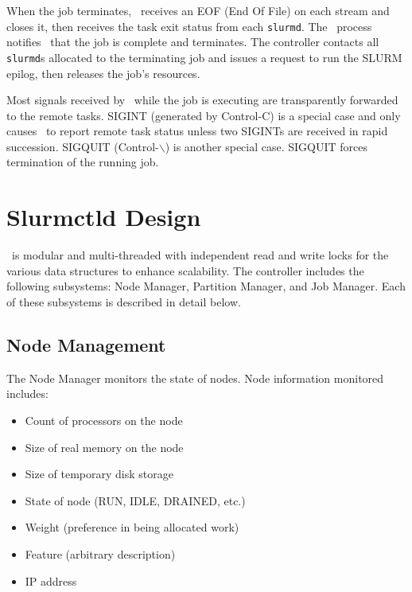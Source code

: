 \documentclass[10pt,onecolumn,times]{llncs}
\begin{document}
{When the job terminates, \srun\ receives an EOF (End Of File) on each
stream and closes it, then receives the task exit status from each
{\tt slurmd}.  The \srun\ process notifies \slurmctld\ that the job is
complete and terminates. The controller contacts all {\tt slurmd}s allocated
to the terminating job and issues a request to run the SLURM epilog,
then releases the job's resources.

Most signals received by \srun\ while the job is executing are 
transparently forwarded to the remote tasks. SIGINT (generated by
Control-C) is a special case and only causes \srun\ to report 
remote task status unless two SIGINTs are received in rapid succession.
SIGQUIT (Control-$\backslash$) is another special case. SIGQUIT forces 
termination of the running job.

\section{Slurmctld Design}

\slurmctld\ is modular and multi-threaded with independent read and
write locks for the various data structures to enhance scalability.
The controller includes the following subsystems: Node Manager, Partition
Manager, and Job Manager.  Each of these subsystems is described in
detail below.

\subsection{Node Management}

The Node Manager monitors the state of nodes.  Node information monitored
includes:

\begin{itemize}
\item Count of processors on the node
\item Size of real memory on the node
\item Size of temporary disk storage
\item State of node (RUN, IDLE, DRAINED, etc.)
\item Weight (preference in being allocated work)
\item Feature (arbitrary description)
\item IP address
\end{itemize}

}
\end{document}
